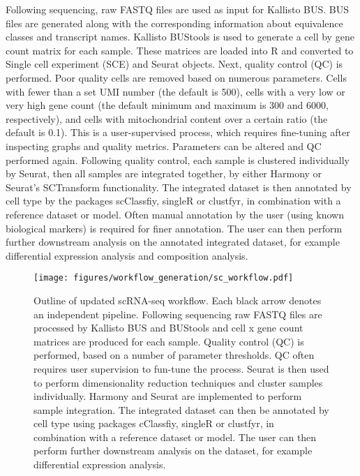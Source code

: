 Following sequencing, raw FASTQ files are used as input for Kallisto BUS.
BUS files are generated along with the corresponding information about equivalence classes and transcript names.
Kallisto BUStools is used to generate a cell by gene count matrix for each sample.
These matrices are loaded into R and converted to Single cell experiment (SCE) and Seurat objects.
Next, quality control (QC) is performed.
Poor quality cells are removed based on numerous parameters.
Cells with fewer than a set UMI number (the default is 500), cells with a very low or very high gene count (the default minimum and maximum is 300 and 6000, respectively), and cells with mitochondrial content over a certain ratio (the default is 0.1).
This is a user-supervised process, which requires fine-tuning after inspecting graphs and quality metrics.
Parameters can be altered and QC performed again.
Following quality control, each sample is clustered individually by Seurat, then all samples are integrated together, by either Harmony or Seurat's SCTransform functionality.
The integrated dataset is then annotated by cell type by the packages scClassfiy, singleR or clustfyr, in combination with a reference dataset or model.
Often manual annotation by the user (using known biological markers) is required for finer annotation.
The user can then perform further downstream analysis on the annotated integrated dataset, for example differential expression analysis and composition analysis.

\begin{figure}[p]
\centering
\texttt{[image: figures/workflow\_generation/sc\_workflow.pdf]}
\caption[Updated scRNA-seq workflow]{Outline of updated scRNA-seq workflow.
Each black arrow denotes an independent pipeline.
Following sequencing raw FASTQ files are processed by Kallisto BUS and BUStools and cell x gene count matrices are produced for each sample.
Quality control (QC) is performed, based on a number of parameter thresholds.
QC often requires user supervision to fun-tune the process.
Seurat is then used to perform dimensionality reduction techniques and cluster samples individually.
Harmony and Seurat are implemented to perform sample integration.
The integrated dataset can then be annotated by cell type using packages cClassfiy, singleR or clustfyr, in combination with a reference dataset or model.
The user can then perform further downstream analysis on the dataset, for example differential expression analysis.
}
\label{fig:updated_sc_workflow}
\end{figure}

